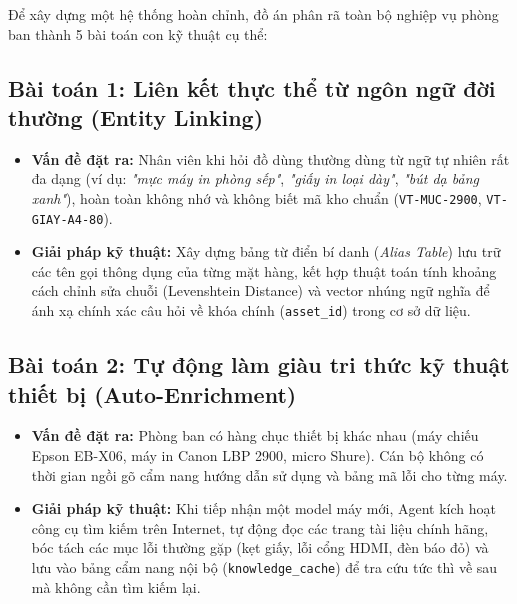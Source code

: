 \documentclass[11pt,a4paper]{article}
\begin{document}
Để xây dựng một hệ thống hoàn chỉnh, đồ án phân rã toàn bộ nghiệp vụ phòng ban thành 5 bài toán con kỹ thuật cụ thể:

\subsection{Bài toán 1: Liên kết thực thể từ ngôn ngữ đời thường (Entity Linking)}
\begin{itemize}
    \item \textbf{Vấn đề đặt ra:} Nhân viên khi hỏi đồ dùng thường dùng từ ngữ tự nhiên rất đa dạng (ví dụ: \textit{"mực máy in phòng sếp"}, \textit{"giấy in loại dày"}, \textit{"bút dạ bảng xanh"}), hoàn toàn không nhớ và không biết mã kho chuẩn (\texttt{VT-MUC-2900}, \texttt{VT-GIAY-A4-80}).
    \item \textbf{Giải pháp kỹ thuật:} Xây dựng bảng từ điển bí danh (\textit{Alias Table}) lưu trữ các tên gọi thông dụng của từng mặt hàng, kết hợp thuật toán tính khoảng cách chỉnh sửa chuỗi (Levenshtein Distance) và vector nhúng ngữ nghĩa để ánh xạ chính xác câu hỏi về khóa chính (\texttt{asset\_id}) trong cơ sở dữ liệu.
\end{itemize}

\subsection{Bài toán 2: Tự động làm giàu tri thức kỹ thuật thiết bị (Auto-Enrichment)}
\begin{itemize}
    \item \textbf{Vấn đề đặt ra:} Phòng ban có hàng chục thiết bị khác nhau (máy chiếu Epson EB-X06, máy in Canon LBP 2900, micro Shure). Cán bộ không có thời gian ngồi gõ cẩm nang hướng dẫn sử dụng và bảng mã lỗi cho từng máy.
    \item \textbf{Giải pháp kỹ thuật:} Khi tiếp nhận một model máy mới, Agent kích hoạt công cụ tìm kiếm trên Internet, tự động đọc các trang tài liệu chính hãng, bóc tách các mục lỗi thường gặp (kẹt giấy, lỗi cổng HDMI, đèn báo đỏ) và lưu vào bảng cẩm nang nội bộ (\texttt{knowledge\_cache}) để tra cứu tức thì về sau mà không cần tìm kiếm lại.
\end{itemize}
\end{document}
